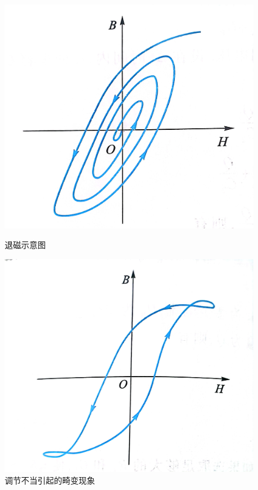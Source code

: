 \documentclass{ctexart}
\begin{document}
  \begin{figure}[H]
    \begin{minipage}[t]{0.45\textwidth}
      \centering
      \includegraphics[width=\textwidth,height=0.3\textheight]{tuicishiyi.jpg}
      \caption{退磁示意图}
      \label{tuicishiyi}
    \end{minipage}
    \begin{minipage}[t]{0.45\textwidth}
      \centering
      \includegraphics[width=\textwidth,height=0.3\textheight]{jibianxianxiang.jpg}
      \caption{调节不当引起的畸变现象}
      \label{jibianxianxiang}
    \end{minipage}
  \end{figure}
\end{document}

